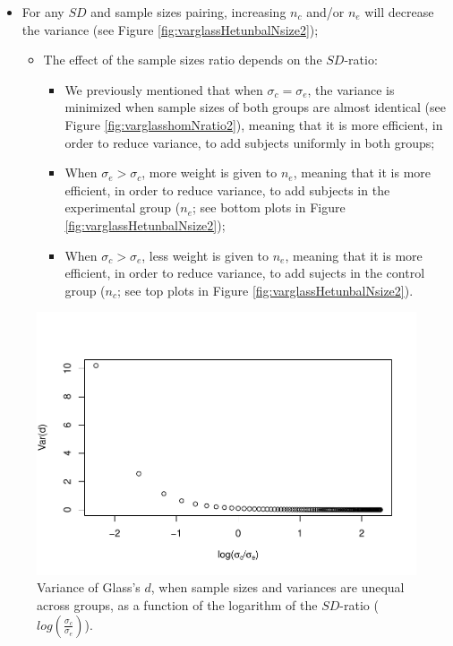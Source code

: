 \documentclass[
  english,
  man,mask]{apa6}
\providecommand{\tightlist}{%
  \setlength{\itemsep}{0pt}\setlength{\parskip}{0pt}}
\begin{document}
\begin{itemize}
\item
  For any \(SD\) and sample sizes pairing, increasing \(n_c\) and/or \(n_e\) will decrease the variance (see Figure \ref{fig:varglassHetunbalNsize2});

  \begin{itemize}
  \tightlist
  \item
    The effect of the sample sizes ratio depends on the \(SD\)-ratio:

    \begin{itemize}
    \tightlist
    \item
      We previously mentioned that when \(\sigma_c=\sigma_e\), the variance is minimized when sample sizes of both groups are almost identical (see Figure \ref{fig:varglasshomNratio2}), meaning that it is more efficient, in order to reduce variance, to add subjects uniformly in both groups;\\
    \item
      When \(\sigma_e > \sigma_c\), more weight is given to \(n_e\), meaning that it is more efficient, in order to reduce variance, to add subjects in the experimental group (\(n_e\); see bottom plots in Figure \ref{fig:varglassHetunbalNsize2});\\
    \item
      When \(\sigma_c > \sigma_e\), less weight is given to \(n_e\), meaning that it is more efficient, in order to reduce variance, to add sujects in the control group (\(n_c\); see top plots in Figure \ref{fig:varglassHetunbalNsize2}).
    \end{itemize}
  \end{itemize}
\end{itemize}

\begin{figure}
\centering
\includegraphics{SupMat1_files/figure-latex/varglasshetunbalSDratio2-1.pdf}
\caption{\label{fig:varglasshetunbalSDratio2}Variance of Glass's \(d\), when sample sizes and variances are unequal across groups, as a function of the logarithm of the \(SD\)-ratio (\(log \left( \frac{\sigma_c}{\sigma_e} \right)\)).}
\end{figure}
\end{document}
